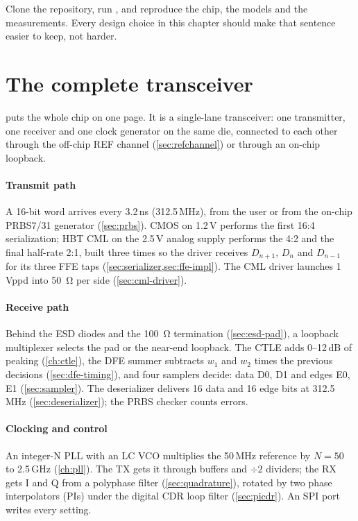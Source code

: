 \begin{insight}
Clone the repository, run , and reproduce the chip, the models and the measurements. Every design choice in this chapter should make that sentence easier to keep, not harder.
\end{insight}

\section{The complete transceiver}\label{sec:arch-block}

 puts the whole chip on one page. It is a single-lane transceiver: one transmitter, one receiver and one clock generator on the same \sgx{} die, connected to each other through the off-chip REF channel (\cref{sec:refchannel}) or through an on-chip loopback.

\paragraph{Transmit path} A 16-bit word arrives every 3.2\,ns (312.5\,MHz), from the user or from the on-chip PRBS7/31 generator (\cref{sec:prbs}). CMOS on 1.2\,V performs the first 16:4 serialization; HBT CML on the 2.5\,V analog supply performs the 4:2 and the final half-rate 2:1, built three times so the driver receives $D_{n+1}$, $D_n$ and $D_{n-1}$ for its three FFE taps (\cref{sec:serializer,sec:ffe-impl}). The CML driver launches 1\,Vppd into \qty{50}{\ohm} per side (\cref{sec:cml-driver}).

\paragraph{Receive path} Behind the ESD diodes and the \qty{100}{\ohm} termination (\cref{sec:esd-pad}), a loopback multiplexer selects the pad or the near-end loopback. The CTLE adds 0--12\,dB of peaking (\cref{ch:ctle}), the DFE summer subtracts $w_1$ and $w_2$ times the previous decisions (\cref{sec:dfe-timing}), and four samplers decide: data D0, D1 and edges E0, E1 (\cref{sec:sampler}). The deserializer delivers 16 data and 16 edge bits at 312.5\,MHz (\cref{sec:deserializer}); the PRBS checker counts errors.

\paragraph{Clocking and control} An integer-N PLL with an LC VCO multiplies the 50\,MHz reference by $N=50$ to 2.5\,GHz (\cref{ch:pll}). The TX gets it through buffers and $\div2$ dividers; the RX gets I and Q from a polyphase filter (\cref{sec:quadrature}), rotated by two phase interpolators (PIs) under the digital CDR loop filter (\cref{sec:picdr}). An SPI port writes every setting.

